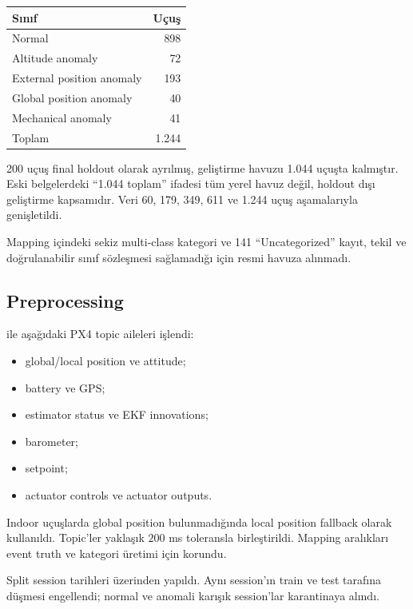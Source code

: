 \documentclass[11pt,a4paper,oneside]{report}
\newcommand{\code}[1]{\texttt{\detokenize{#1}}}
\begin{document}
\begin{center}
\begin{tabular}{lr}
\toprule
\textbf{Sınıf} & \textbf{Uçuş}\\
\midrule
Normal & 898\\
Altitude anomaly & 72\\
External position anomaly & 193\\
Global position anomaly & 40\\
Mechanical anomaly & 41\\
\midrule
Toplam & 1.244\\
\bottomrule
\end{tabular}
\end{center}

200 uçuş final holdout olarak ayrılmış, geliştirme havuzu 1.044 uçuşta
kalmıştır. Eski belgelerdeki ``1.044 toplam'' ifadesi tüm yerel havuz değil,
holdout dışı geliştirme kapsamıdır. Veri 60, 179, 349, 611 ve 1.244 uçuş
aşamalarıyla genişletildi.

Mapping içindeki sekiz multi-class kategori ve 141 ``Uncategorized'' kayıt,
tekil ve doğrulanabilir sınıf sözleşmesi sağlamadığı için resmi havuza
alınmadı.

\subsection{Preprocessing}

\code{pyulog} ile aşağıdaki PX4 topic aileleri işlendi:

\begin{itemize}
  \item global/local position ve attitude;
  \item battery ve GPS;
  \item estimator status ve EKF innovations;
  \item barometer;
  \item setpoint;
  \item actuator controls ve actuator outputs.
\end{itemize}

Indoor uçuşlarda global position bulunmadığında local position fallback
olarak kullanıldı. Topic'ler yaklaşık \(200\) ms toleransla birleştirildi.
Mapping aralıkları event truth ve kategori üretimi için korundu.

Split session tarihleri üzerinden yapıldı. Aynı session'ın train ve test
tarafına düşmesi engellendi; normal ve anomali karışık session'lar
karantinaya alındı.
\end{document}
